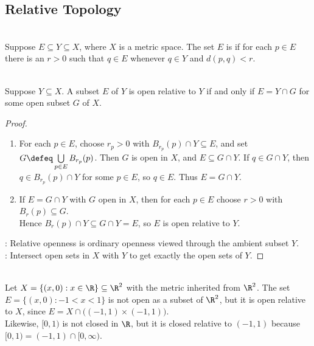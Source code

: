 \subsection{Relative Topology}

\begin{definition} \label{def:relative-open-subset} \\
Suppose $E\subseteq Y\subseteq X$, where $X$ is a metric space. The set $E$ is  if for each $p\in E$ there is an $r>0$ such that $q\in E$ whenever $q\in Y$ and $d(p,q)<r$.
\end{definition}

\begin{theorem} \label{thm:relative-open-intersection-with-open-set} \\
Suppose $Y\subseteq X$. A subset $E$ of $Y$ is open relative to $Y$ if and only if $E=Y\cap G$ for some open subset $G$ of $X$.
\begin{proof}
\begin{enumerate}[label=\roman*.]
\setlength{\itemsep}{0pt}
\item[$(\Rightarrow)$] For each $p\in E$, choose $r_p>0$ with $B_{r_p}(p)\cap Y\subseteq E$, and set $G\defeq\bigcup\limits_{p\in E}B_{r_p}(p)$. Then $G$ is open in $X$, and $E\subseteq G\cap Y$. If $q\in G\cap Y$, then $q\in B_{r_p}(p)\cap Y$ for some $p\in E$, so $q\in E$. Thus $E=G\cap Y$.
\item[$(\Leftarrow)$] If $E=G\cap Y$ with $G$ open in $X$, then for each $p\in E$ choose $r>0$ with $B_r(p)\subseteq G$.\\
Hence $B_r(p)\cap Y\subseteq G\cap Y=E$, so $E$ is open relative to $Y$.
\end{enumerate}
: Relative openness is ordinary openness viewed through the ambient subset $Y$.\\
: Intersect open sets in $X$ with $Y$ to get exactly the open sets of $Y$.
\end{proof}
\end{theorem}

\begin{example} \label{ex:relative-topology-ambient-examples} \\
Let $X=\{(x,0):x\in\R\}\subseteq\R^2$ with the metric inherited from $\R^2$. The set $E=\{(x,0):-1<x<1\}$ is not open as a subset of $\R^2$, but it is open relative to $X$, since $E=X\cap\bigl((-1,1)\times(-1,1)\bigr)$.\\
Likewise, $[0,1)$ is not closed in $\R$, but it is closed relative to $(-1,1)$ because $[0,1)=(-1,1)\cap[0,\infty)$.
\end{example}
